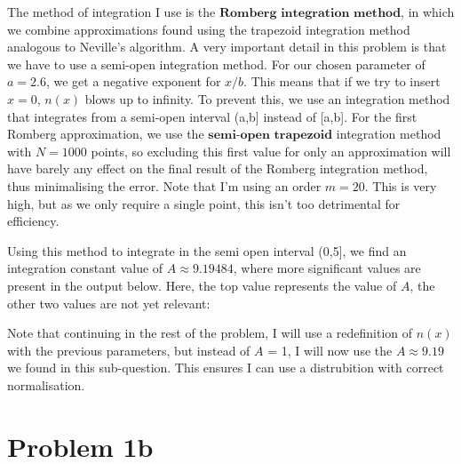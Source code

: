 The method of integration I use is the $\textbf{Romberg integration method}$, in which we combine approximations found using the trapezoid integration method analogous to Neville's algorithm. A very important detail in this problem is that we have to use a semi-open integration method. For our chosen parameter of $a = 2.6$, we get a negative exponent for $x/b$. This means that if we try to insert $x = 0$, $n(x)$ blows up to infinity. To prevent this, we use an integration method that integrates from a semi-open interval (a,b] instead of [a,b]. For the first Romberg approximation, we use the $\textbf{semi-open trapezoid}$ integration method with $N =1000$ points, so excluding this first value for only an approximation will have barely any effect on the final result of the Romberg integration method, thus minimalising the error. Note that I'm using an order $m=20$. This is very high, but as we only require a single point, this isn't too detrimental for efficiency.

\newpage 
Using this method to integrate in the semi open interval (0,5], we find an integration constant value of $A \approx 9.19484$, where more significant values are present in the output below. Here, the top value represents the value of $A$, the other two values are not yet relevant: 



Note that continuing in the rest of the problem, I will use a redefinition of $n(x)$ with the previous parameters, but instead of $A$ = 1, I will now use the $A \approx 9.19$ we found in this sub-question. This ensures I can use a distrubition with correct normalisation. 

\section*{Problem 1b}


